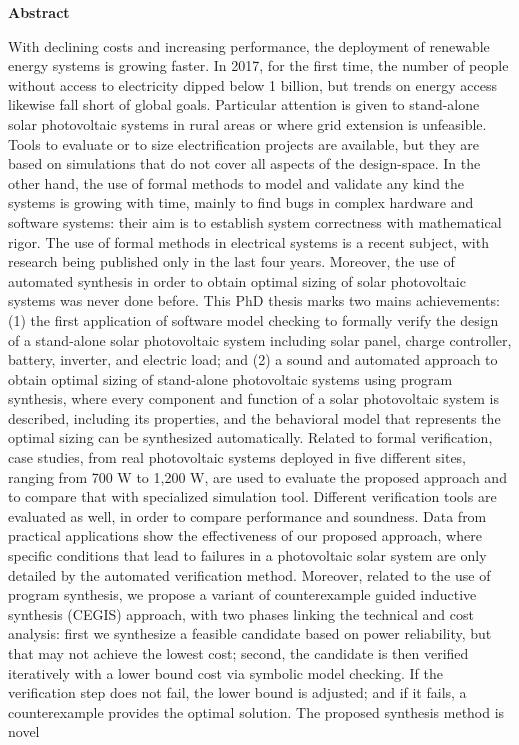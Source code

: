 \thispagestyle{plain}
\begin{center}
%    
%    
%    
    \vspace{0.9cm}
    \textbf{Abstract}
\end{center}
With declining costs and increasing performance, the deployment of renewable energy systems is growing faster. In 2017, for the first time, the number of people without access to electricity dipped below 1 billion, but trends on energy access likewise fall short of global goals. Particular attention is given to stand-alone solar photovoltaic systems in rural areas or where grid extension is unfeasible. Tools to evaluate or to size electrification projects are available, but they are based on simulations that do not cover all aspects of the design-space. In the other hand, the use of formal methods to model and validate any kind the systems is growing with time, mainly to find bugs in complex hardware and software systems: their aim is to establish system correctness with mathematical rigor. The use of formal methods in electrical systems is a recent subject, with research being published only in the last four years. Moreover, the use of automated synthesis in order to obtain optimal sizing of solar photovoltaic systems was never done before. This PhD thesis marks two mains achievements: (1) the first application of software model checking to formally verify the design of a stand-alone solar photovoltaic system including solar panel, charge controller, battery, inverter, and electric load; and (2) a sound and automated approach to obtain optimal sizing of stand-alone photovoltaic systems using program synthesis, where every component and function of a solar photovoltaic system is described, including its properties, and the behavioral model that represents the optimal sizing can be synthesized automatically. Related to formal verification, case studies, from real photovoltaic systems deployed in five different sites, ranging from 700 W to 1,200 W, are used to evaluate the proposed approach and to compare that with specialized simulation tool. Different verification tools are evaluated as well, in order to compare performance and soundness. Data from practical applications show the effectiveness of our proposed approach, where specific conditions that lead to failures in a photovoltaic solar system are only detailed by the automated verification method. Moreover, related to the use of program synthesis, we propose a variant of counterexample guided inductive synthesis (CEGIS) approach, with two phases linking the technical and cost analysis: first we synthesize a feasible candidate based on power reliability, but that may not achieve the lowest cost; second, the candidate is then verified iteratively with a lower bound cost via symbolic model checking. If the verification step does not fail, the lower bound is adjusted; and if it fails, a counterexample provides the optimal solution. The proposed synthesis method is novel 